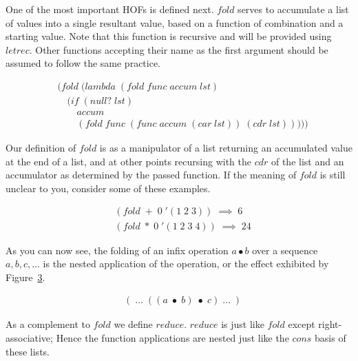 One of the most important HOFs is defined next. $fold$ serves to accumulate a list 
of values into a single resultant value, based on a function of combination and a 
starting value. Note that this function is recursive and will be provided using 
$letrec$. Other functions accepting their name as the first argument should be 
assumed to follow the same practice.

\begin{figure}[htp]
\footnotesize
\caption{}\label{fig:foldDef}
\begin{align*}
& (fold \; (lambda \; (fold \; func \; accum \; lst)
\\& \quad (if \; (null? \; lst)
\\& \qquad accum
\\& \qquad (fold \; func \; (func \; accum \; (car \; lst)) \; (cdr \; lst)))))
\end{align*}
\end{figure}

Our definition of $fold$ is as a manipulator of a list returning an accumulated 
value at the end of a list, and at other points recursing with the $cdr$ of the 
list and an accumulator as determined by the passed function. If the meaning of 
$fold$ is still unclear to you, consider some of these examples.

\begin{figure}[htp]
\footnotesize
\caption{}\label{fig:foldExamples}
\begin{align*}
& (fold \; + \; 0 \; '(1 \; 2 \; 3)) \; \implies \; 6
\\& (fold \; * \; 0 \; '(1 \; 2 \; 3 \; 4)) \; \implies \; 24
\end{align*}
\end{figure}

As you can now see, the folding of an infix operation $a \bullet b$ over a 
sequence $a, b, c, ...$ is the nested application of the operation, or the 
effect exhibited by Figure~\ref{fig:foldVisual}.

\begin{figure}[htp]
\footnotesize
\caption{}\label{fig:foldVisual}
\begin{align*}
& ( \; \dots \; ((a \; \bullet \; b) \; \bullet \; c) \; \dots \; )
\end{align*}
\end{figure}

As a complement to $fold$ we define $reduce$. $reduce$ is just like $fold$ except 
right-associative; Hence the function applications are nested just like the $cons$ 
basis of these lists.

